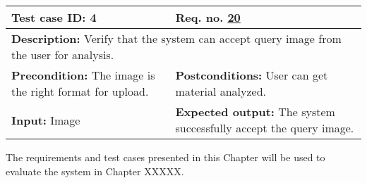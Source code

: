 \begin{table}[H]
\begin{tabular}{|p{7cm}|p{7cm}|}
\hline
\rowcolor[HTML]{D8E9F7} 
\textbf{Test case ID: 4}& \textbf{Req. no. \hyperlink{req:20}{20}}\\ \hline

\multicolumn{2}{|p{14cm}|}{\textbf{Description:} \newline Verify that the system can accept query image from the user for analysis.} \\ \hline

\textbf{Precondition:} \newline The image is the right format for upload.& 
\textbf{Postconditions:} \newline User can get material analyzed.\\ \hline

\textbf{Input:} \newline
Image&
\textbf{Expected output:} \newline
The system successfully accept the query image.\\ \hline
\end{tabular}
\end{table}

\noindent The requirements and test cases presented in this Chapter will be used to evaluate the system in Chapter XXXXX.